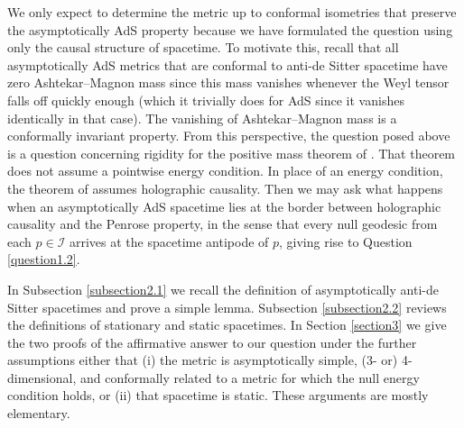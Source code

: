 \documentclass[12pt]{amsart}
\numberwithin{equation}{section}
\begin{document}
We only expect to determine the metric up to conformal isometries that preserve the asymptotically AdS property because we have formulated the question using only the causal structure of spacetime. To motivate this, recall that all asymptotically AdS metrics that are conformal to anti-de Sitter spacetime have zero Ashtekar--Magnon mass \cite{AM} since this mass vanishes whenever the Weyl tensor falls off quickly enough (which it trivially does for AdS since it vanishes identically in that case). The vanishing of Ashtekar--Magnon mass is a conformally invariant property. From this perspective, the question posed above is a question concerning rigidity for the positive mass theorem of \cite{PSW}. That theorem does not assume a pointwise energy condition. In place of an energy condition, the theorem of \cite{PSW} assumes holographic causality. Then we may ask what happens when an asymptotically AdS spacetime lies at the border between holographic causality and the Penrose property, in the sense that every null geodesic from each $p\in {\mathcal I}$ arrives at the spacetime antipode of $p$, giving rise to Question \ref{question1.2}.

In Subsection \ref{subsection2.1} we recall the definition of asymptotically anti-de Sitter spacetimes and prove a simple lemma. Subsection \ref{subsection2.2} reviews the definitions of stationary and static spacetimes. In Section \ref{section3} we give the two proofs of the affirmative answer to our question under the further assumptions either that (i) the metric is asymptotically simple, (3- or) 4-dimensional, and conformally related to a metric for which the null energy condition holds, or (ii) that spacetime is static. These arguments are mostly elementary.
\end{document}
